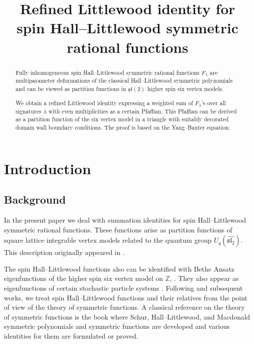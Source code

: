 \documentclass[ALCO,Unicode]{cedram}
\title[Refined Littlewood identity for spin Hall--Littlewood functions]{Refined Littlewood identity for spin Hall--Littlewood symmetric rational functions}
\author[\initial{S.} Gavrilova]{\firstname{Svetlana} \lastname{Gavrilova}}
\begin{document}
\begin{abstract}
  Fully inhomogeneous spin Hall--Littlewood symmetric rational
  functions $F_\lambda$ are multiparameter deformations of the classical Hall--Littlewood symmetric polynomials and can be viewed as partition functions in $\mathfrak{sl}(2)$ higher spin six vertex models.
  
  We obtain a refined Littlewood identity
  expressing a 
  weighted sum of $F_\lambda$'s over all signatures $\lambda$ with even multiplicities
  as a certain Pfaffian. This Pfaffian can be derived as
  a partition function of the six vertex model in a triangle
  with suitably decorated domain wall boundary conditions.
  The proof
  is based on the Yang--Baxter equation.
\end{abstract}


\maketitle

\noindent

\section{Introduction}
\label{sec:intro}
\subsection{Background}

In the present paper we deal with summation 
identities for spin Hall--Little\-wood symmetric
rational functions. These functions
arise
as 
partition functions
of square lattice integrable
vertex models
related to the quantum group $U_q(\widehat{\mathfrak{sl}_2})$. This description originally appeared in \cite{Bor17,BP18}.

The spin Hall--Littlewood functions
also can be identified with Bethe Ansatz eigenfunctions 
of the higher spin six vertex model on $\mathbb{Z}$, \cf \cite[Ch. VII]{KBI93}.
They also appear as eigenfunctions of certain stochastic particle systems
\cite{Pov13,BCPS15,CP16}. Following
\cite{Bor17,BP18} and subsequent works, we treat spin Hall--Littlewood functions and their relatives from the point of
view of the theory of symmetric functions.
A classical reference on the theory of symmetric functions is the book
\cite{Mac95} where Schur, Hall--Littlewood, and Macdonald symmetric
polynomials
and symmetric functions are developed and various identities for them are formulated or proved.
\end{document}
